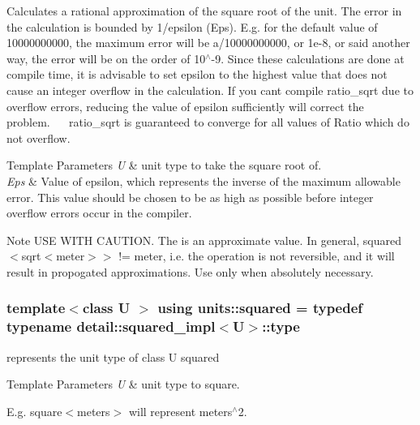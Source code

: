 Calculates a rational approximation of the square root of the unit. The error in the calculation is bounded by 1/epsilon (Eps). E.\+g. for the default value of 10000000000, the maximum error will be a/10000000000, or 1e-\/8, or said another way, the error will be on the order of 10$^\wedge$-\/9. Since these calculations are done at compile time, it is advisable to set epsilon to the highest value that does not cause an integer overflow in the calculation. If you can\textquotesingle{}t compile {\ttfamily ratio\+\_\+sqrt} due to overflow errors, reducing the value of epsilon sufficiently will correct the problem.~\newline
~\newline
 {\ttfamily ratio\+\_\+sqrt} is guaranteed to converge for all values of {\ttfamily Ratio} which do not overflow. 
\begin{DoxyTemplParams}{Template Parameters}
{\em U} & {\ttfamily unit} type to take the square root of. \\
\hline
{\em Eps} & Value of epsilon, which represents the inverse of the maximum allowable error. This value should be chosen to be as high as possible before integer overflow errors occur in the compiler. \\
\hline
\end{DoxyTemplParams}
\begin{DoxyNote}{Note}
U\+S\+E W\+I\+T\+H C\+A\+U\+T\+I\+O\+N. The is an approximate value. In general, squared$<$sqrt$<$meter$>$$>$ != meter, i.\+e. the operation is not reversible, and it will result in propogated approximations. Use only when absolutely necessary. 
\end{DoxyNote}
\hypertarget{group___unit_manipulators_ga636346f7898c35eb98a796bec1d77fb2}{}
\subsubsection[{squared}]{\setlength{\rightskip}{0pt plus 5cm}template$<$class U $>$ using {\bf units\+::squared} = typedef typename detail\+::squared\+\_\+impl$<$U$>$\+::type}\label{group___unit_manipulators_ga636346f7898c35eb98a796bec1d77fb2}


represents the unit type of {\ttfamily class U} squared 


\begin{DoxyTemplParams}{Template Parameters}
{\em U} & {\ttfamily unit} type to square.\\
\hline
\end{DoxyTemplParams}
E.\+g. {\ttfamily square$<$meters$>$} will represent meters$^\wedge$2. \hypertarget{group___unit_manipulators_ga9f187b866f1123e65db38a5fbd745698}{}

